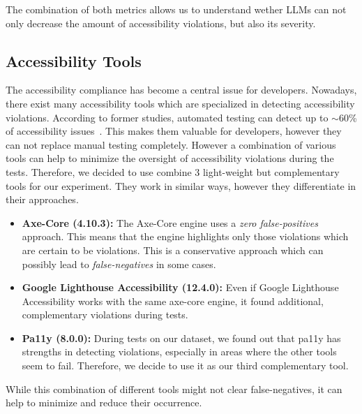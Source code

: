 The combination of both metrics allows us to understand wether LLMs can not only decrease
the amount of accessibility violations, but also its severity.

\subsection{Accessibility Tools}
The accessibility compliance has become a central issue for 
developers. Nowadays, there exist many accessibility tools which are 
specialized in detecting accessibility violations. 
According to former studies, automated testing can detect up to $\sim$60\% 
of accessibility issues~\parencite{deque2023accessibility}. This makes them 
valuable for developers, however they can not replace manual testing completely.
However a combination of various tools can help to minimize the 
oversight of accessibility violations during the tests.
Therefore, we decided to use combine 3
light-weight but complementary tools for our experiment.
They work in similar ways, however they
differentiate in their approaches.
\begin{itemize}
  \item \textbf{Axe-Core (4.10.3):} The Axe-Core engine uses a \textit{zero 
  false-positives} approach. This means that the engine highlights only 
  those violations which are certain to be violations. This is a
  conservative approach which can possibly lead to \textit{false-negatives} in some cases.
  \item \textbf{Google Lighthouse Accessibility (12.4.0):} Even if Google Lighthouse Accessibility 
  works with the same axe-core engine, it found additional, complementary violations during tests.
  \item \textbf{Pa11y (8.0.0):} During tests on our dataset, we found out that pa11y has 
  strengths in detecting violations, especially in areas where the other tools
  seem to fail. Therefore, we decide to use it as our third complementary tool.
\end{itemize}

While this combination of different tools might not clear false-negatives, it can
help to minimize and reduce their occurrence.

